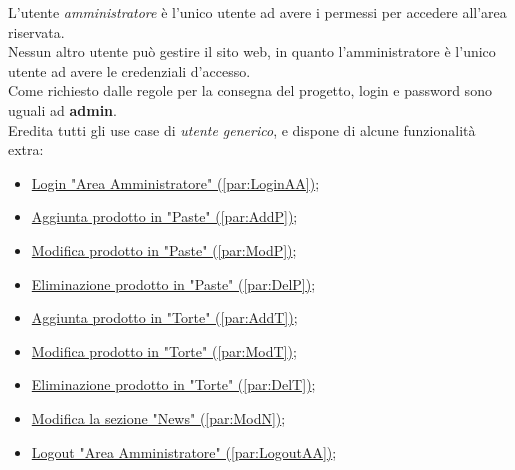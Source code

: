 L'utente \emph{amministratore} è l'unico utente ad avere i permessi per accedere all'area riservata.\\ 
Nessun altro utente può gestire il sito web, in quanto l'amministratore è l'unico utente ad avere le credenziali d'accesso.\\  
Come richiesto dalle regole per la consegna del progetto, login e password sono uguali ad \textbf{admin}.\\ 
Eredita tutti gli use case di \textit{utente generico}, e dispone di alcune funzionalità extra:
\begin{itemize}
	\item \hyperref[par:LoginAA]{ Login "Area Amministratore" (\ref{par:LoginAA})};
	\item \hyperref[par:AddP]{ Aggiunta prodotto in "Paste" (\ref{par:AddP})};
	\item \hyperref[par:ModP]{ Modifica prodotto in "Paste" (\ref{par:ModP})};
	\item \hyperref[par:DelP]{ Eliminazione prodotto in "Paste" (\ref{par:DelP})};
	\item \hyperref[par:AddT]{ Aggiunta prodotto in "Torte" (\ref{par:AddT})};
	\item \hyperref[par:ModT]{ Modifica prodotto in "Torte" (\ref{par:ModT})};
	\item \hyperref[par:DelT]{ Eliminazione prodotto in "Torte" (\ref{par:DelT})};
	\item \hyperref[par:ModN]{ Modifica la sezione "News" (\ref{par:ModN})};
	\item \hyperref[par:LogoutAA]{ Logout "Area Amministratore" (\ref{par:LogoutAA})};
\end{itemize}

